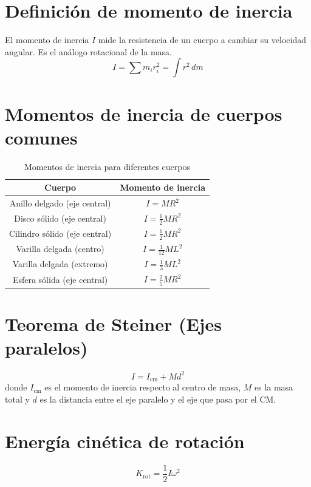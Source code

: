 \section{Definición de momento de inercia}

El momento de inercia \(I\) mide la resistencia de un cuerpo a cambiar su velocidad angular. Es el análogo rotacional de la masa.
\begin{equation}
    I = \sum m_i r_i^2 = \int r^2 \, dm
\end{equation}

\section{Momentos de inercia de cuerpos comunes}

\begin{table}[h!]
    \centering
    \begin{tabular}{|c|c|}
        \hline
        \textbf{Cuerpo} & \textbf{Momento de inercia} \\
        \hline
        Anillo delgado (eje central) & \(I = M R^2\) \\
        Disco sólido (eje central) & \(I = \frac{1}{2} M R^2\) \\
        Cilindro sólido (eje central) & \(I = \frac{1}{2} M R^2\) \\
        Varilla delgada (centro) & \(I = \frac{1}{12} M L^2\) \\
        Varilla delgada (extremo) & \(I = \frac{1}{3} M L^2\) \\
        Esfera sólida (eje central) & \(I = \frac{2}{5} M R^2\) \\
        \hline
    \end{tabular}
    \caption{Momentos de inercia para diferentes cuerpos}
\end{table}

\section{Teorema de Steiner (Ejes paralelos)}
\begin{equation}
    I = I_{\text{cm}} + M d^2
\end{equation}
donde \(I_{\text{cm}}\) es el momento de inercia respecto al centro de masa, \(M\) es la masa total y \(d\) es la distancia entre el eje paralelo y el eje que pasa por el CM.

\section{Energía cinética de rotación}
\begin{equation}
    K_{\text{rot}} = \frac{1}{2} I \omega^2
\end{equation}

